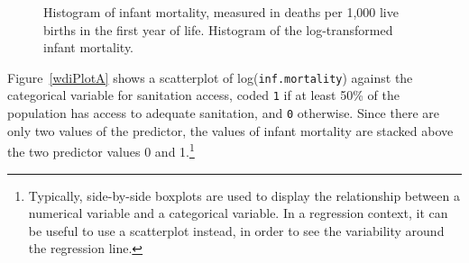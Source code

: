 \begin{figure}[h]
	\centering
	\caption{ Histogram of infant mortality, measured in deaths per 1,000 live births in the first year of life.  Histogram of the log-transformed infant mortality.}
	\label{wdiHistTransform}
\end{figure}

\textD{\newpage}

Figure~\ref{wdiPlotA} shows a scatterplot of log(\texttt{inf.mortality}) against the categorical variable for sanitation access, coded \texttt{1} if at least 50\% of the population has access to adequate sanitation, and \texttt{0} otherwise. Since there are only two values of the predictor, the values of infant mortality are stacked above the two predictor values 0 and 1.\footnote{Typically, side-by-side boxplots are used to display the relationship between a numerical variable and a categorical variable. In a regression context, it can be useful to use a scatterplot instead, in order to see the variability around the regression line.} 

